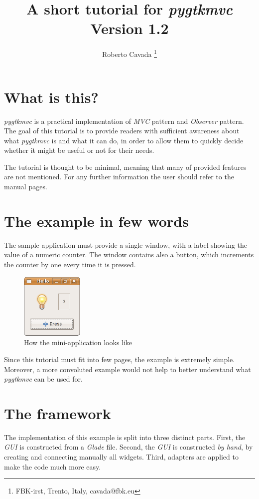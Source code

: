 \documentclass{article}
\newcommand{\kw}[1]{\emph{#1}\xspace}
\newcommand{\appl}[1]{\textsl{#1}\xspace}
\newcommand{\glade}{\appl{Glade}}
\newcommand{\mvc}{\kw{MVC} pattern\xspace}
\newcommand{\obs}{\kw{Observer} pattern\xspace}
\newcommand{\gui}{\kw{GUI}}
\newcommand{\pygtkmvc}{\kw{pygtkmvc}}
\begin{document}
\title{A short tutorial for \pygtkmvc\\
Version 1.2}

\author{ Roberto Cavada \thanks{FBK-irst, Trento, Italy,
 cavada@fbk.eu} }

\maketitle

\tableofcontents
\newpage

\section{What is this?}
\pygtkmvc is a practical implementation of \mvc and \obs. The goal of
this tutorial is to provide readers with sufficient awareness about
what \pygtkmvc is and what it can do, in order to allow them to
quickly decide whether it might be useful or not for their needs.

The tutorial is thought to be minimal, meaning that many of provided
features are not mentioned. For any further information the user
should refer to the manual pages.


\section{The example in few words}
The sample application must provide a single window, with a label
showing the value of a numeric counter. The window contains also a
button, which increments the counter by one every time it is pressed.

\begin{figure}[htbp]
\begin{center}
\includegraphics[width=3cm]{eps/appl}
\caption{How the mini-application looks like}
\end{center}
\end{figure}


Since this tutorial must fit into few pages, the example is extremely
simple. Moreover, a more convoluted example would not help to better
understand what \pygtkmvc can be used for.


\section{The framework}
The implementation of this example is split into three distinct
parts. First, the \gui is constructed from a \glade file. Second,
the \gui is constructed \emph{by hand}, by creating and connecting
manually all widgets. Third, adapters are applied to make the code
much more easy.
\end{document}
